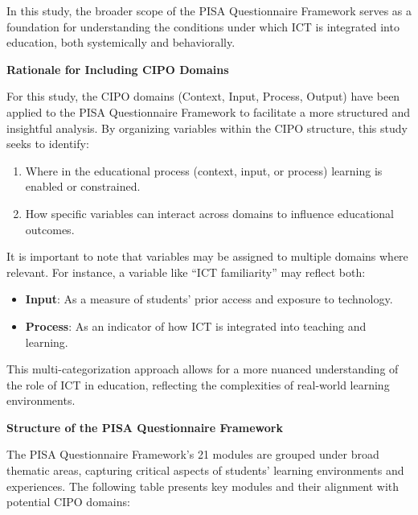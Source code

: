 \documentclass[
]{article}
\begin{document}
In this study, the broader scope of the PISA Questionnaire Framework
serves as a foundation for understanding the conditions under which ICT
is integrated into education, both systemically and behaviorally.

\textbf{Rationale for Including CIPO Domains}

For this study, the CIPO domains (Context, Input, Process, Output) have
been applied to the PISA Questionnaire Framework to facilitate a more
structured and insightful analysis. By organizing variables within the
CIPO structure, this study seeks to identify:

\begin{enumerate}
\def\labelenumi{\arabic{enumi}.}
\item
  Where in the educational process (context, input, or process) learning
  is enabled or constrained.
\item
  How specific variables can interact across domains to influence
  educational outcomes.
\end{enumerate}

It is important to note that variables may be assigned to multiple
domains where relevant. For instance, a variable like ``ICT
familiarity'' may reflect both:

\begin{itemize}
\item
  \textbf{Input}: As a measure of students' prior access and exposure to
  technology.
\item
  \textbf{Process}: As an indicator of how ICT is integrated into
  teaching and learning.
\end{itemize}

This multi-categorization approach allows for a more nuanced
understanding of the role of ICT in education, reflecting the
complexities of real-world learning environments.

\textbf{Structure of the PISA Questionnaire Framework}

The PISA Questionnaire Framework's 21 modules are grouped under broad
thematic areas, capturing critical aspects of students' learning
environments and experiences. The following table presents key modules
and their alignment with potential CIPO domains:
\end{document}

